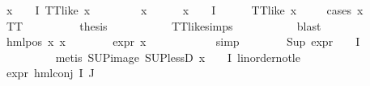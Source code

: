 \begin{isabellebody}
\ {\isachardoublequoteopen}{\isasymforall}x\ {\isasymin}\ {\isasymPhi}\ {\isacharbackquote}{\kern0pt}\ I{\isachardot}{\kern0pt}\ TT{\isacharunderscore}{\kern0pt}like\ x{\isachardoublequoteclose}\isanewline
\ \ \isamarkupfalse%
\isanewline
\ \ \ \ \isamarkupfalse%
\ x\isanewline
\ \ \ \ \isamarkupfalse%
\ {\isachardoublequoteopen}x\ {\isasymin}\ {\isasymPhi}\ {\isacharbackquote}{\kern0pt}\ I{\isachardoublequoteclose}\isanewline
\ \ \ \ \isamarkupfalse%
\ {\isachardoublequoteopen}TT{\isacharunderscore}{\kern0pt}like\ x{\isachardoublequoteclose}\isanewline
\ \ \ \ \isamarkupfalse%
{\isacharparenleft}{\kern0pt}cases\ x{\isacharparenright}{\kern0pt}\isanewline
\ \ \ \ \ \ \isamarkupfalse%
\ TT\isanewline
\ \ \ \ \ \ \isamarkupfalse%
\ \isamarkupfalse%
\ {\isacharquery}{\kern0pt}thesis\ \isanewline
\ \ \ \ \ \ \ \ \isamarkupfalse%
\ TT{\isacharunderscore}{\kern0pt}like{\isachardot}{\kern0pt}simps\ \isanewline
\ \ \ \ \ \ \ \ \isamarkupfalse%
\ blast\isanewline
\ \ \ \ \isamarkupfalse%
\isanewline
\ \ \ \ \ \ \isamarkupfalse%
\ {\isacharparenleft}{\kern0pt}hml{\isacharunderscore}{\kern0pt}pos\ x{}{}\ x{}{}{\isacharparenright}{\kern0pt}\isanewline
\ \ \ \ \ \ \isamarkupfalse%
\ {\isachardoublequoteopen}expr{\isacharunderscore}{\kern0pt}{}\ x\ {\isasymge}\ {}{\isachardoublequoteclose}\isanewline
\ \ \ \ \ \ \ \ \isamarkupfalse%
\ simp\isanewline
\ \ \ \ \ \ \isamarkupfalse%
\ {\isachardoublequoteopen}Sup\ {\isacharparenleft}{\kern0pt}{\isacharparenleft}{\kern0pt}expr{\isacharunderscore}{\kern0pt}{}\ {\isasymcirc}\ {\isasymPhi}{\isacharparenright}{\kern0pt}\ {\isacharbackquote}{\kern0pt}\ I{\isacharparenright}{\kern0pt}\ {\isasymge}\ {}{\isachardoublequoteclose}\isanewline
\ \ \ \ \ \ \ \ \isamarkupfalse%
\ {\isacharparenleft}{\kern0pt}metis\ SUP{\isacharunderscore}{\kern0pt}image\ SUP{\isacharunderscore}{\kern0pt}lessD\ {\isacartoucheopen}x\ {\isasymin}\ {\isasymPhi}\ {\isacharbackquote}{\kern0pt}\ I{\isacartoucheclose}\ linorder{\isacharunderscore}{\kern0pt}not{\isacharunderscore}{\kern0pt}le{\isacharparenright}{\kern0pt}\isanewline
\ \ \ \ \ \ \isamarkupfalse%
\ {\isachardoublequoteopen}expr{\isacharunderscore}{\kern0pt}{}\ {\isacharparenleft}{\kern0pt}hml{\isacharunderscore}{\kern0pt}conj\ I\ J\ {\isasymPhi}{\isacharparenright}{\kern0pt}\ {\isasymge}\ {}{\isachardoublequoteclose}\isanewline

\end{isabellebody}
